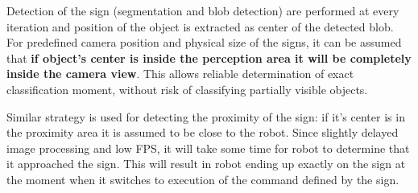 Detection of the sign (segmentation and blob detection) are performed at every iteration and position of the object is extracted as center of the detected blob. For predefined camera position and physical size of the signs, it can be assumed that \textbf{if object's center is inside the perception area it will be completely inside the camera view}. This allows reliable determination of exact classification moment, without risk of classifying partially visible objects.

Similar strategy is used for detecting the proximity of the sign: if it's center is in the proximity area it is assumed to be close to the robot. Since slightly delayed image processing and low FPS, it will take some time for robot to determine that it approached the sign. This will result in robot ending up exactly on the sign at the moment when it switches to execution of the command defined by the sign.
